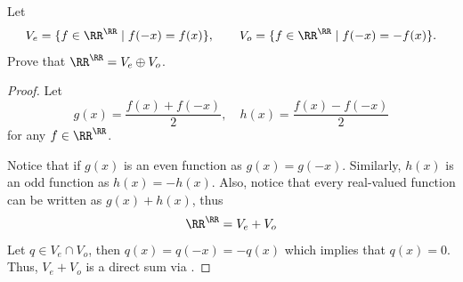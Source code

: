 \begin{exercise}
    Let
    \[
        V_e = \{f \in \RR^\RR \mid f(-x)=f(x)\},
        \qquad
        V_o = \{f \in \RR^\RR \mid f(-x)=-f(x)\}.
    \]
    Prove that $\RR^\RR = V_e \oplus V_o$.
\end{exercise}

\begin{proof}
    Let 
    \[ g(x)= \frac{f(x)+f(-x)}{2}, \quad h(x)=\frac{f(x)-f(-x)}{2} \] 
    for any $f \in \RR^\RR$.

    Notice that if $g(x)$ is an even function as $g(x)=g(-x)$.
    Similarly, $h(x)$ is an odd function as $h(x)=-h(x)$.
    Also, notice that every real-valued function can be written as $g(x)+h(x)$, thus
    \[ \RR^\RR = V_e + V_o \]
    Let $q \in V_e \cap V_o$, then $q(x)=q(-x)=-q(x)$ which implies that $q(x)=0$. Thus, $V_e + V_o$ is a direct sum via 
    .
\end{proof}